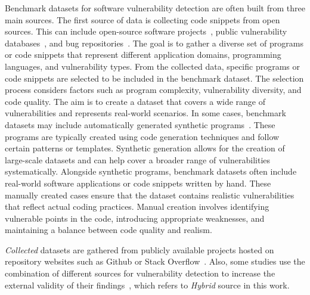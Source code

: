 Benchmark datasets for software vulnerability detection are often built from three main sources. The first source of data is collecting code snippets from open sources. This can include open-source software projects~\cite{jimenez2016empirical}, public vulnerability databases~\cite{black2017sard}, and bug repositories~\cite{bugzilla2021bugzilla}. The goal is to gather a diverse set of programs or code snippets that represent different application domains, programming languages, and vulnerability types. From the collected data, specific programs or code snippets are selected to be included in the benchmark dataset. The selection process considers factors such as program complexity, vulnerability diversity, and code quality. The aim is to create a dataset that covers a wide range of vulnerabilities and represents real-world scenarios. In some cases, benchmark datasets may include automatically generated synthetic programs~\cite{booth2013national}. These programs are typically created using code generation techniques and follow certain patterns or templates. Synthetic generation allows for the creation of large-scale datasets and can help cover a broader range of vulnerabilities systematically. Alongside synthetic programs, benchmark datasets often include real-world software applications or code snippets written by hand. These manually created cases ensure that the dataset contains realistic vulnerabilities that reflect actual coding practices. Manual creation involves identifying vulnerable points in the code, introducing appropriate weaknesses, and maintaining a balance between code quality and realism.

\textit{Collected} datasets are gathered from publicly available projects hosted on repository websites such as Github or Stack Overflow~\cite{chen2020machine, zhou2017automated, liu2019deepbalance, pradel2018deepbugs, cheng2021deepwukong, zhou2019devign}. Also, some studies use the combination of different sources for vulnerability detection to increase the external validity of their findings~\cite{chen2020machine, zhou2017automated, russell2018automated, wang2020combining, le2021deepcva, hin2022linevd, li2021vulnerability}, which refers to \textit{Hybrid} source in this work.

